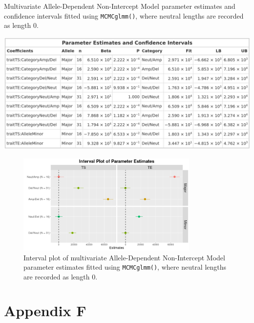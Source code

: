 \begin{table}[!htb]
\centering
\caption[Multivariate Allele-Dependent Non-Intercept Model parameter estimates and confidence intervals fitted using \texttt{MCMCglmm()}.]{Multivariate Allele-Dependent Non-Intercept Model parameter estimates and confidence intervals fitted using \texttt{MCMCglmm()}, where neutral lengths are recorded as length 0.}
      
\includegraphics[width = 1\textwidth]{../tables/Chapter_5/Multivariate_MCMC_6_AD_Model_Pred.png}
\end{table}

\begin{figure}[!htb]
\vspace{0.5cm}
     
\centering
\includegraphics[width = 0.8\textwidth]{../figures/Chapter_5/Multivariate_MCMC_6_AD_Interval.png}
 
\caption[Interval plot of multivariate Allele-Dependent Non-Intercept Model parameter estimates fitted using \texttt{MCMCglmm()}.]{Interval plot of multivariate Allele-Dependent Non-Intercept Model parameter estimates fitted using \texttt{MCMCglmm()}, where neutral lengths are recorded as length 0.}
\end{figure}
\FloatBarrier

\section*{Appendix F}
\renewcommand{\thefigure}{F\arabic{figure}}
\renewcommand{\thetable}{F\arabic{table}}
\setcounter{figure}{0}
\setcounter{table}{0}


